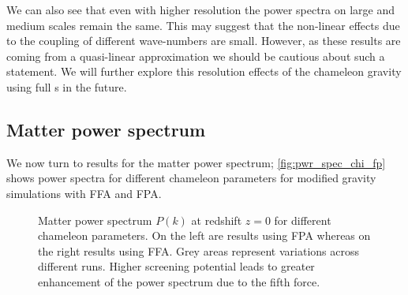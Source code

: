 We can also see that even with higher resolution the power spectra on large and medium scales remain the same. This may suggest that the non-linear effects due to the coupling of different wave-numbers are small. However, as these results are coming from a quasi-linear approximation we should be cautious about such a statement. We will further explore this resolution effects of the chameleon gravity using full \nbodysim s in the future.
\subsection{Matter power spectrum}
We now turn to results for the matter power spectrum; \autoref{fig:pwr_spec_chi_fp} shows power spectra for different chameleon parameters for modified gravity simulations with FFA and FPA.
\begin{figure*}[bt]
	\begin{adjustwidth}{-1cm}{-1cm}
	\centering
		\begin{subfigure}{1.2\textwidth}
		\end{subfigure}
		\begin{subfigure}{0.5\textwidth}
		\end{subfigure}%
		\begin{subfigure}{0.5\textwidth}
		\end{subfigure}
		\begin{subfigure}{0.5\textwidth}
		\end{subfigure}%
		\begin{subfigure}{0.5\textwidth}
		\end{subfigure}
	\end{adjustwidth}
    \caption{Matter power spectrum $P(k)$ at redshift $z=0$ for different chameleon parameters. On the left are results using FPA whereas on the right results using FFA. Grey areas represent variations across different runs. Higher screening potential leads to greater enhancement of the power spectrum due to the fifth force.}
    \label{fig:pwr_spec_chi_fp}
\end{figure*}

